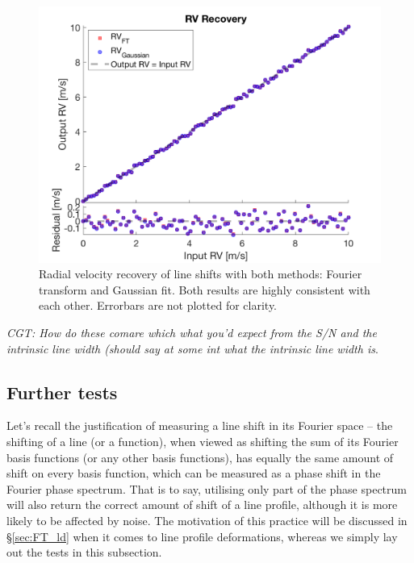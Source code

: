 \begin{figure}[tbp]
\centering
\includegraphics[width = 0.7 \linewidth]
{./Figures/Methods/5-LINE_SHIFT_ONLY.png}
\caption[Radial velocity recovery]
{Radial velocity recovery of line shifts with both methods: Fourier transform and Gaussian fit. Both results are highly consistent with each other. Errorbars are not plotted for clarity.}
\label{fig:rv_recovery}
\end{figure} 
\FloatBarrier

{\em CGT: How do these comare which what you'd expect from the S/N and the intrinsic line width (should say at some int what the intrinsic line width is}.



\subsection{Further tests}
\label{sec:Further_tests}

Let's recall the justification of measuring a line shift in its Fourier space -- the shifting of a line (or a function), when viewed as shifting the sum of its Fourier basis functions (or any other basis functions), has equally the same amount of shift on every basis function, which can be measured as a phase shift in the Fourier phase spectrum. That is to say, utilising only part of the phase spectrum will also return the correct amount of shift of a line profile, although it is more likely to be affected by noise. The motivation of this practice will be discussed in \S\ref{sec:FT_ld} when it comes to line profile deformations, whereas we simply lay out the tests in this subsection. 

